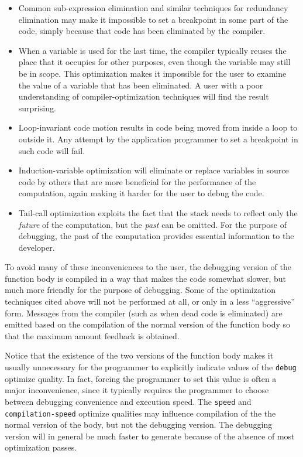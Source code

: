 \begin{itemize}
\item Common sub-expression elimination and similar techniques for
  redundancy elimination may make it impossible to set
  a breakpoint in some part of the code, simply because that code has
  been eliminated by the compiler.
\item When a variable is used for the last time, the compiler
  typically reuses the place that it occupies for other purposes, even
  though the variable may still be in scope.  This optimization makes
  it impossible for the user to examine the value of
  a variable that has been eliminated.  A user with
  a poor understanding of compiler-optimization techniques will find
  the result surprising.
\item Loop-invariant code motion results in code being moved from
  inside a loop to outside it.  Any attempt by the application
  programmer to set a breakpoint in such code will fail.
\item Induction-variable optimization will eliminate or replace
  variables in source code by others that are more beneficial for
  the performance of the computation, again making it harder for the
  user to debug the code.
\item Tail-call optimization exploits the fact that the stack needs to
  reflect only the \emph{future} of the computation, but the
  \emph{past} can be omitted.  For the purpose of debugging, the past
  of the computation provides essential information to the developer.
\end{itemize}

\noindent
To avoid many of these inconveniences to the user,
the debugging version of the function body is compiled in a way that
makes the code somewhat slower, but much more friendly for the purpose
of debugging.  Some of the optimization techniques cited above will
not be performed at all, or only in a less ``aggressive'' form.
Messages from the compiler (such as when dead code is eliminated) are
emitted based on the compilation of the normal version of the function
body so that the maximum amount feedback is obtained.

Notice that the existence of the two versions of the function body
makes it usually unnecessary for the programmer to explicitly indicate
values of the \texttt{debug} optimize quality.  In fact, forcing the
programmer to set this value is often a major inconvenience, since it
typically requires the programmer to choose between debugging
convenience and execution speed.  The \texttt{speed} and
\texttt{compilation-speed} optimize qualities may influence
compilation of the the normal version of the body, but not the
debugging version.  The debugging version will in general be much
faster to generate because of the absence of most optimization passes.

